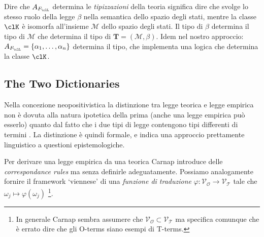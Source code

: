 Dire che $A_{F_\clL}$ determina le \emph{tipizzazioni} della teoria significa 
dire che svolge lo stesso ruolo della legge $\beta$ nella semantica dello spazio degli 
stati, mentre la classe $\clK$ è isomorfa all'insieme $\mathcal{M}$ dello spazio 
degli stati. Il tipo di $\beta$ determina il tipo di $\mathcal{M}$ che determina il 
tipo di $\mathbf{T} = (\mathcal{M}, \beta)$. Idem nel nostro approccio: $A_{F_\clL} 
= \{\alpha_1,\dots,\alpha_n\}$ determina il tipo, che implementa una logica che determina 
la classe $\clK$. 

\subsection{The Two Dictionaries}
Nella concezione neopositivistica la distinzione tra legge teorica e legge empirica non è dovuta alla natura ipotetica della prima (anche una legge empirica può esserlo) quanto dal fatto che i due tipi di legge contengono tipi differenti di termini \cite{}. La distinzione è quindi formale, e indica una approccio prettamente linguistico a questioni epistemologiche. 

Per derivare una legge empirica da una teorica Carnap introduce delle \emph{correspondance rules} ma senza definirle adeguatamente. Possiamo analogamente fornire il framework `viennese' di una \emph{funzione di traduzione} $\varphi: \mathcal{V_O} \to \mathcal{V_T}$ tale che $\omega_j \mapsto \varphi (\omega_j)$ \footnote{In generale Carnap sembra assumere che $\mathcal{V_O} \subset \mathcal{V_T}$ ma specifica comunque che è errato dire che gli O-terms siano esempi di T-terms.}.

